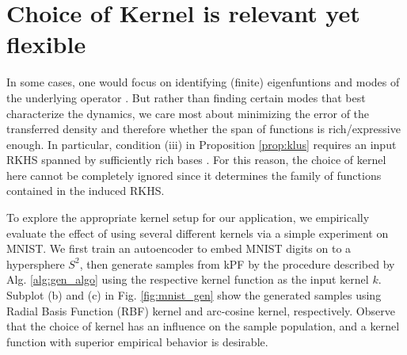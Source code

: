\clearpage
\appendix

\section{Choice of Kernel is relevant yet flexible}\label{sec:choice_of_kernel}

In some cases, one would focus on identifying (finite) eigenfuntions and modes of the underlying operator \citep{williams2015extDMD,brunton2016sindy}. But rather than finding certain modes that best characterize the dynamics, we care most about minimizing the error of the transferred density and therefore whether the span of functions is rich/expressive enough. In particular, condition (iii) in Proposition \ref{prop:klus} requires an input RKHS spanned by sufficiently rich bases \citep{fukumizu2013kernel}. For this reason, the choice of kernel here 
cannot be completely ignored since it determines the family of functions contained in the induced RKHS.

To explore the appropriate kernel setup for our application, we empirically evaluate the effect of using several different kernels via a simple experiment on MNIST. We first train an autoencoder to embed MNIST digits on to a hypersphere $S^2$, then generate samples from kPF by the procedure described by Alg. \ref{alg:gen_algo} using the respective kernel function as the input kernel $k$. Subplot (b) and (c) in Fig. \ref{fig:mnist_gen} show the generated samples using Radial Basis Function (RBF) kernel and arc-cosine kernel, respectively. Observe that the choice of kernel has an influence on the sample population, and a kernel function with superior empirical behavior is desirable. 

